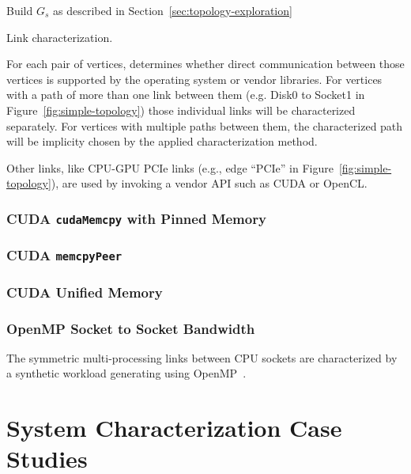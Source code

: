 \begin{algorithm}[ht]
    \SetAlgoLined
     Build $G_s$ as described in Section~\ref{sec:topology-exploration}\;
     \caption{Link characterization.}
     \label{alg:link-char}
\end{algorithm}

For each pair of vertices,  determines whether direct communication between those vertices is supported by the operating system or vendor libraries.
For vertices with a path of more than one link between them (e.g. Disk0 to Socket1 in Figure~\ref{fig:simple-topology}) those individual links will be characterized separately.
For vertices with multiple paths between them, the characterized path will be implicity chosen by the applied characterization method.





Other links, like CPU-GPU PCIe links (e.g., edge ``PCIe'' in Figure~\ref{fig:simple-topology}), are used by invoking a vendor API such as CUDA or OpenCL.

\subsubsection{CUDA \texttt{cudaMemcpy} with Pinned Memory}
\subsubsection{CUDA \texttt{memcpyPeer}}
\subsubsection{CUDA Unified Memory}
\subsubsection{OpenMP Socket to Socket Bandwidth}

The symmetric multi-processing links between CPU sockets are characterized by a synthetic workload generating using OpenMP~\cite{openmp2013}.



%
%
\section{System Characterization Case Studies}

